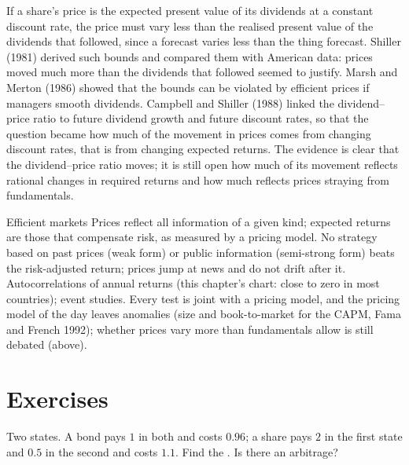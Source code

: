 \begin{debate}
If a share's price is the expected present value of its dividends at a constant discount rate, the
price must vary less than the realised present value of the dividends that followed, since a forecast
varies less than the thing forecast. Shiller (1981) derived such bounds and compared them with American
data: prices moved much more than the dividends that followed seemed to justify. Marsh and Merton
(1986) showed that the bounds can be violated by efficient prices if managers smooth dividends. Campbell
and Shiller (1988) linked the dividend--price ratio to future dividend growth and future discount rates,
so that the question became how much of the movement in prices comes from changing discount rates,
that is from changing expected returns. The evidence is clear that the dividend--price ratio moves; it
is still open how much of its movement reflects rational changes in required returns and how much
reflects prices straying from fundamentals.
\end{debate}

\begin{model}{Efficient markets}
\assumes Prices reflect all information of a given kind; expected returns are those that compensate
risk, as measured by a pricing model.
\predicts No strategy based on past prices (weak form) or public information (semi-strong form) beats
the risk-adjusted return; prices jump at news and do not drift after it.
\tested Autocorrelations of annual returns (this chapter's chart: close to zero in most countries);
event studies.
\breaks Every test is joint with a pricing model, and the pricing model of the day leaves anomalies
(size and book-to-market for the CAPM, Fama and French 1992); whether prices vary more than
fundamentals allow is still debated (above).
\end{model}

\section{Exercises}\label{sec:b2:asset-prices:exercises}

\begin{exercise}[$\star$]\label{exo:b2:asset-prices:1}
Two states. A bond pays $1$ in both and costs $0.96$; a share pays $2$ in the first state and $0.5$ in
the second and costs $1.1$. Find the . Is there an arbitrage?
\end{exercise}


